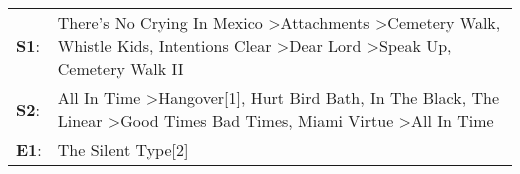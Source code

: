 \begin{supertabular}{p{0.03\textwidth}p{0.92\textwidth}}
 \textbf{S1}:  &  There's No Crying In Mexico\textsuperscript{} \textgreater \enspace Attachments\textsuperscript{} \textgreater \enspace Cemetery Walk\textsuperscript{}, \enspace Whistle Kids\textsuperscript{}, \enspace Intentions Clear\textsuperscript{} \textgreater \enspace Dear Lord\textsuperscript{} \textgreater \enspace Speak Up\textsuperscript{}, \enspace Cemetery Walk II\textsuperscript{}  \enspace  \\
 \textbf{S2}:  &                         All In Time\textsuperscript{} \textgreater \enspace Hangover[1]\textsuperscript{}, \enspace Hurt Bird Bath\textsuperscript{}, \enspace In The Black\textsuperscript{}, \enspace The Linear\textsuperscript{} \textgreater \enspace Good Times Bad Times\textsuperscript{}, \enspace Miami Virtue\textsuperscript{} \textgreater \enspace All In Time\textsuperscript{}  \enspace  \\
 \textbf{E1}:  &                                                                                                                                                                                                                                                                                                                                                           The Silent Type[2]\textsuperscript{}  \enspace  \\
\end{supertabular}
